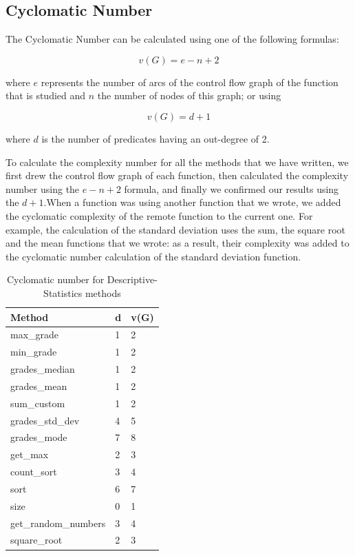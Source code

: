 \documentclass[11pt]{article}
\begin{document}
\subsection{Cyclomatic Number}

The Cyclomatic Number can be calculated using one of the following formulas:

$$ v(G) = e - n + 2 $$

where $ e $ represents the number of arcs of the control flow graph of the function that is studied and $ n $ the number of nodes of this graph; or using

$$ v(G) = d + 1 $$

where $ d $ is the number of predicates having an out-degree of 2.\newline 

To calculate the complexity number for all the methods that we have written, we first drew the control flow graph of each function, then calculated the complexity number using the $ e - n + 2 $ formula, and finally we confirmed our results using the $ d + 1 $.\newline\newline When a function was using another function that we wrote, we added the cyclomatic complexity of the remote function to the current one. For example, the calculation of the standard deviation uses the sum, the square root and the mean functions that we wrote: as a result, their complexity was added to the cyclomatic number calculation of the standard deviation function.\newline

\begin{table}[ht!]
\centering
\begin{tabular}{|l|l|l|}
\hline
Method           & d & v(G) \\ \hline
max\_grade       & 1 & 2    \\ \hline
min\_grade       & 1 & 2    \\ \hline
grades\_median   & 1 & 2    \\ \hline
grades\_mean     & 1 & 2    \\ \hline
sum\_custom      & 1 & 2    \\ \hline
grades\_std\_dev & 4 & 5    \\ \hline
grades\_mode     & 7 & 8    \\ \hline
get\_max         & 2 & 3    \\ \hline
count\_sort      & 3 & 4    \\ \hline
sort             & 6 & 7    \\ \hline
size             & 0 & 1    \\ \hline
get\_random\_numbers & 3 & 4    \\ \hline
square\_root     & 2 & 3    \\ \hline
\end{tabular}
\caption{Cyclomatic number for Descriptive-Statistics methods}
\end{table}
\end{document}
